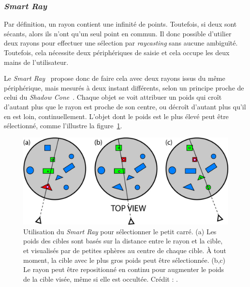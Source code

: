 	\subsubsection{\emph{Smart Ray}}
	Par définition, un rayon contient une infinité de points. Toutefois, si deux sont sécants, alors ils n'ont qu'un seul point en commun. Il donc possible d'utilier deux rayons pour effectuer une sélection par \emph{raycasting} sans aucune ambiguïté. Toutefois, cela nécessite deux périphériques de saisie et cela occupe les deux mains de l'utilisateur.
	
	Le \emph{Smart Ray}~\cite{grossman2006design} propose donc de faire cela avec deux rayons issus du même périphérique, mais mesurés à deux instant différents, selon un principe proche de celui du \emph{Shadow Cone}~\cite{steed20043d}. Chaque objet se voit attribuer un \og poids \fg{} qui croît d'autant plus que le rayon est proche de son centre, ou décroît d'autant plus qu'il en est loin, continuellement. L'objet dont le poids est le plus élevé peut être sélectionné, comme l'illustre la figure~\ref{fig:smartRay}.
	
	\begin{figure}[!htb]
		\centering
		\includegraphics[width=\rayWidth]{figures/ch2/smartRay}
		\caption[Principe du \emph{Smart Ray}]{Utilisation du \emph{Smart Ray} pour sélectionner le petit carré. (a) Les poids des cibles sont basés sur la distance entre le rayon et la cible, et visualisés par de petites sphères au centre de chaque cible. À tout moment, la cible avec le plus gros poids peut être sélectionnée. (b,c) Le rayon peut être repositionné en continu pour augmenter le poids de la cible visée, même si elle est occultée. Crédit : \cite{grossman2006design}.}
		\label{fig:smartRay}
	\end{figure}
	
